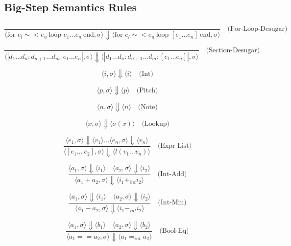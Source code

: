 \documentclass[letterpaper,12pt]{article}
\begin{document}
\subsection{Big-Step Semantics Rules}
    \[
        \frac{
            \begin{array}{c}
            \end{array}
        }{
            \langle \text{for } e_l \sim< e_u \ \text{loop } e_1 \dots e_n \ \text{end}, \sigma \rangle \Downarrow 
            \langle \text{for } e_l \sim< e_u \ \text{loop } [e_1 \dots e_n] \ \text{end}, \sigma \rangle
        }
        \quad \text{(For-Loop-Desugar)}
    \]

    \[
        \frac{}
            {\langle |d_1 \dots d_n:d_{n+1} \dots d_m:e_1 \dots e_n|, \sigma\rangle \Downarrow \langle |d_1 \dots d_n:d_{n+1} \dots d_m:[e_1 \dots e_n]|, \sigma\rangle} \quad \text{(Section-Desugar)}
        \]
    
    
    \[
    \langle i, \sigma \rangle \Downarrow \langle i \rangle \quad \text{(Int)}
    \]

    \[
    \langle p, \sigma \rangle \Downarrow \langle p \rangle \quad \text{(Pitch)}
    \]

    \[
    \langle n, \sigma \rangle \Downarrow \langle n \rangle \quad \text{(Note)}
    \]
    
    \[
    \langle x, \sigma \rangle \Downarrow \langle \sigma{(x)} \rangle \quad \text{(Lookup)}
    \]

    \[
    \frac{\langle e_1, \sigma \rangle \Downarrow \langle v_1 \rangle \dots \langle e_n, \sigma \rangle \Downarrow \langle v_n \rangle}{\langle [e_1 \dots \ e_2], \sigma \rangle \Downarrow \langle l(v_1 \dots v_n) \rangle} \quad \text{(Expr-List)}
    \]

    \[
    \frac{\langle a_1, \sigma \rangle \Downarrow \langle i_1 \rangle \quad \langle a_2, \sigma \rangle \Downarrow \langle i_2 \rangle}{\langle a_1 + a_2, \sigma \rangle \Downarrow \langle i_1 +_{int} i_2 \rangle} \quad \text{(Int-Add)}
    \]

    \[
    \frac{\langle a_1, \sigma \rangle \Downarrow \langle i_1 \rangle \quad \langle a_2, \sigma \rangle \Downarrow \langle i_2 \rangle}{\langle a_1 - a_2, \sigma \rangle \Downarrow \langle i_1 -_{int} i_2 \rangle} \quad \text{(Int-Min)}
    \]

    \[
    \frac{\langle a_1, \sigma \rangle \Downarrow \langle b_1 \rangle \quad \langle a_2, \sigma \rangle \Downarrow \langle b_2 \rangle}{\langle a_1 == a_2, \sigma \rangle \Downarrow \langle a_1 =_{int} a_2 \rangle} \quad \text{(Bool-Eq)}
    \]
\end{document}
